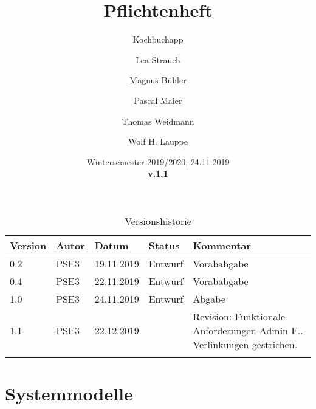 \documentclass[a4paper,parskip=full]{scrreprt}
\newcommand{\version}{1.1}
\begin{document}
\title{Pflichtenheft}
\subtitle{\Large{Kochbuchapp}}
\date{
	\vspace{3cm}
	 Wintersemester 2019/2020, 24.11.2019\\
	\vspace{1cm}
	\textbf {v.\version}
}
\author{
        Lea Strauch  
        \and Magnus Bühler
        \and Pascal Maier 
        \and Thomas Weidmann
        \and Wolf H. Lauppe
        }
        
\maketitle


\newpage
\begin{table}[b]
\centering
\begin{tabular}{|l|l|l|l|p{}|}\hline
	\textbf{Version}	&\textbf{Autor}	&\textbf{Datum}	&\textbf{Status}	&\textbf{Kommentar}
\\\hline 	0.2		&PSE3		&19.11.2019		&Entwurf		&Vorababgabe
\\\hline	0.4		&PSE3		&22.11.2019		&Entwurf		&Vorababgabe
\\\hline	1.0		&PSE3		&24.11.2019		&Entwurf		&Abgabe
\\\hline	1.1		&PSE3		&22.12.2019		&			& Revision: Funktionale Anforderungen Admin F.. Verlinkungen gestrichen. 
\\\hline				&			&			&			&
\\\hline
\end{tabular}
\caption{\label{tab:revision}Versionshistorie}
\end{table}




\newpage

\newpage
{}
\tableofcontents
\newpage
{}








\chapter{Systemmodelle}





%
%
\printnoidxglossaries
\end{document}
